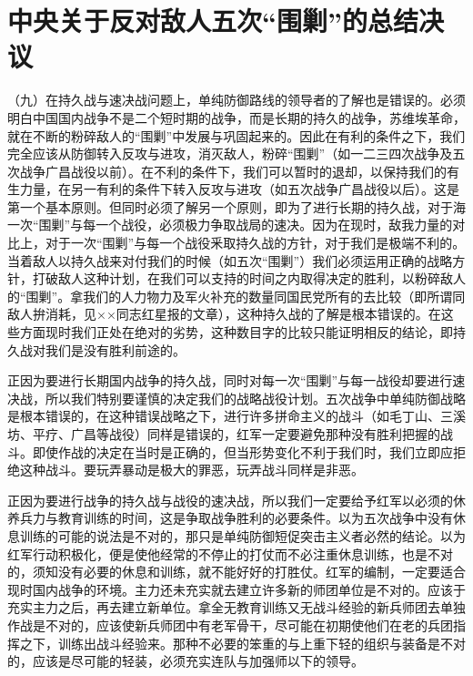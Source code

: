 \section[中央关于反对敌人五次“围剿”的总结决议（一九三五年一月八日）]{中央关于反对敌人五次“围剿”的总结决议}


（九）在持久战与速决战问题上，单纯防御路线的领导者的了解也是错误的。必须明白中国国内战争不是二个短时期的战争，而是长期的持久的战争，苏维埃革命，就在不断的粉碎敌人的“围剿”中发展与巩固起来的。因此在有利的条件之下，我们完全应该从防御转入反攻与进攻，消灭敌人，粉碎“围剿”（如一二三四次战争及五次战争广昌战役以前）。在不利的条件下，我们可以暂时的退却，以保持我们的有生力量，在另一有利的条件下转入反攻与进攻（如五次战争广昌战役以后）。这是第一个基本原则。但同时必须了解另一个原则，即为了进行长期的持久战，对于海一次“围剿”与每一个战役，必须极力争取战局的速决。因为在现时，敌我力量的对比上，对于一次“围剿”与每一个战役釆取持久战的方针，对于我们是极端不利的。当着敌人以持久战来对付我们的时候（如五次“围剿”）我们必须运用正确的战略方针，打破敌人这种计划，在我们可以支持的时间之内取得决定的胜利，以粉碎敌人的“围剿”。拿我们的人力物力及军火补充的数量同国民党所有的去比较（即所谓同敌人拚消耗，见××同志红星报的文章），这种持久战的了解是根本错误的。在这些方面现时我们正处在绝对的劣势，这种数目字的比较只能证明相反的结论，即持久战对我们是没有胜利前途的。

正因为要进行长期国内战争的持久战，同时对每一次“围剿”与每一战役却要进行速决战，所以我们特别要谨慎的决定我们的战略战役计划。五次战争中单纯防御战略是根本错误的，在这种错误战略之下，进行许多拼命主义的战斗（如毛丁山、三溪坊、平疗、广昌等战役）同样是错误的，红军一定要避免那种没有胜利把握的战斗。即使作战的决定在当时是正确的，但当形势变化不利于我们时，我们立即应拒绝这种战斗。要玩弄暴动是极大的罪恶，玩弄战斗同样是非恶。

正因为要进行战争的持久战与战役的速决战，所以我们一定要给予红军以必须的休养兵力与教育训练的时间，这是争取战争胜利的必要条件。以为五次战争中没有休息训练的可能的说法是不对的，那只是单纯防御短促突击主义者必然的结论。以为红军行动积极化，便是使他经常的不停止的打仗而不必注重休息训练，也是不对的，须知没有必要的休息和训练，就不能好好的打胜仗。红军的编制，一定要适合现时国内战争的环境。主力还未充实就去建立许多新的师团单位是不对的。应该于充实主力之后，再去建立新单位。拿全无教育训练又无战斗经验的新兵师团去单独作战是不对的，应该使新兵师团中有老军骨干，尽可能在初期使他们在老的兵团指挥之下，训练出战斗经验来。那种不必要的笨重的与上重下轻的组织与装备是不对的，应该是尽可能的轻装，必须充实连队与加强师以下的领导。

